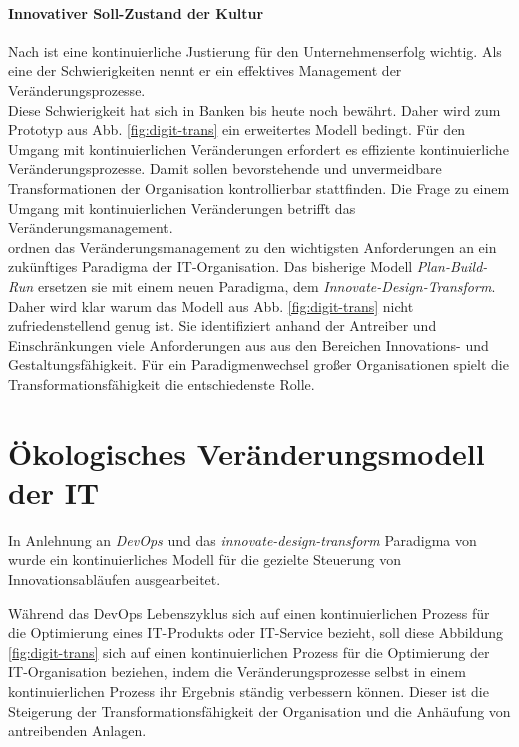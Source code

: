 \paragraph{Innovativer Soll-Zustand der Kultur}
Nach \citet[S.30]{Bussmann2006} ist eine kontinuierliche Justierung für den Unternehmenserfolg wichtig. Als eine der Schwierigkeiten nennt er ein effektives Management der Veränderungsprozesse.
\medskip
\\
Diese Schwierigkeit hat sich in Banken bis heute noch bewährt.
Daher wird zum Prototyp aus Abb. \ref{fig:digit-trans} ein erweitertes Modell bedingt. Für den Umgang mit kontinuierlichen Veränderungen erfordert es effiziente kontinuierliche Veränderungsprozesse.
Damit sollen bevorstehende und unvermeidbare Transformationen der Organisation kontrollierbar stattfinden.
Die Frage zu einem Umgang mit kontinuierlichen Veränderungen betrifft das Veränderungsmanagement.
\medskip
\\
\citet[S. 184f]{Koch2016} ordnen das Veränderungsmanagement zu den wichtigsten Anforderungen an ein zukünftiges Paradigma der IT-Organisation. Das bisherige Modell \emph{Plan-Build-Run} ersetzen sie mit einem neuen Paradigma, dem \emph{Innovate-Design-Transform}.
\medskip
\\
Daher wird klar warum das Modell aus Abb. \ref{fig:digit-trans} nicht zufriedenstellend genug ist. Sie identifiziert anhand der Antreiber und Einschränkungen viele Anforderungen aus \cite[Tab. 11.1]{Koch2016} aus den Bereichen Innovations- und Gestaltungsfähigkeit. Für ein Paradigmenwechsel großer Organisationen spielt die Transformationsfähigkeit die entschiedenste Rolle.

\section{Ökologisches Veränderungsmodell der IT}
\label{idta-modell-chap}
In Anlehnung an \emph{DevOps} \cite{Alt2017} und das \emph{innovate-design-transform} Paradigma von \citet{Koch2016} wurde ein kontinuierliches Modell für die gezielte Steuerung von Innovationsabläufen \cite{Ganswindt2006} ausgearbeitet.

Während das DevOps Lebenszyklus \cite{Alt2017} sich auf einen kontinuierlichen Prozess für die Optimierung eines IT-Produkts oder IT-Service bezieht, soll diese Abbildung \ref{fig:digit-trans} sich auf einen kontinuierlichen Prozess für die Optimierung der IT-Organisation beziehen, indem die Veränderungsprozesse selbst in einem kontinuierlichen Prozess ihr Ergebnis ständig verbessern können. Dieser ist die Steigerung der Transformationsfähigkeit der Organisation und die Anhäufung von antreibenden Anlagen.
\medskip
\\
 

